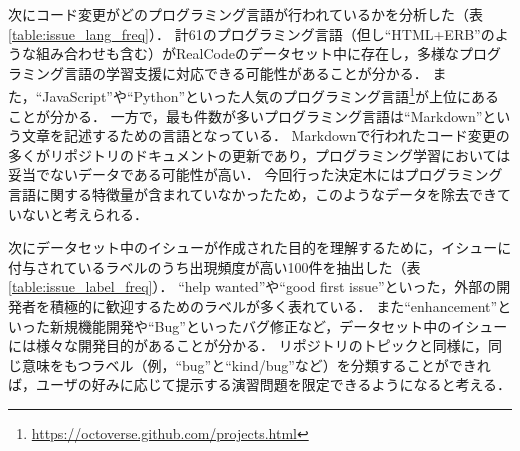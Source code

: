 次にコード変更がどのプログラミング言語が行われているかを分析した（表\ref{table:issue_lang_freq}）．
計61のプログラミング言語（但し``HTML+ERB''のような組み合わせも含む）がRealCodeのデータセット中に存在し，多様なプログラミング言語の学習支援に対応できる可能性があることが分かる．
また，``JavaScript''や``Python''といった人気のプログラミング言語\footnote{\url{https://octoverse.github.com/projects.html}}が上位にあることが分かる．
一方で，最も件数が多いプログラミング言語は``Markdown''という文章を記述するための言語となっている．
Markdownで行われたコード変更の多くがリポジトリのドキュメントの更新であり，プログラミング学習においては妥当でないデータである可能性が高い．
今回行った決定木にはプログラミング言語に関する特徴量が含まれていなかったため，このようなデータを除去できていないと考えられる．

次にデータセット中のイシューが作成された目的を理解するために，イシューに付与されているラベルのうち出現頻度が高い100件を抽出した（表\ref{table:issue_label_freq}）．
``help wanted''や``good first issue''といった，外部の開発者を積極的に歓迎するためのラベルが多く表れている．
また``enhancement''といった新規機能開発や``Bug''といったバグ修正など，データセット中のイシューには様々な開発目的があることが分かる．
リポジトリのトピックと同様に，同じ意味をもつラベル（例，``bug''と``kind/bug''など）を分類することができれば，ユーザの好みに応じて提示する演習問題を限定できるようになると考える．



